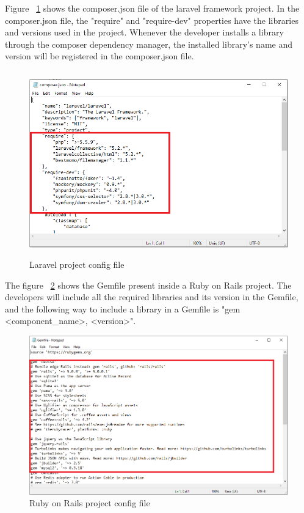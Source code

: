 Figure ~\ref{fig:laravel} shows the composer.json file of the laravel framework project. In the composer.json file, the "require" and "require-dev" properties have the libraries and versions used in the project. Whenever the developer installs a library through the composer dependency manager, the installed library's name and version will be registered in the composer.json file.
\begin{figure}[H]
	\includegraphics[width=15cm,height=8cm]{includes/laravel.PNG}
	\centering
	\caption{Laravel project config file}
	\label{fig:laravel}
\end{figure}
The figure ~\ref{fig:ruby} shows the Gemfile present inside a Ruby on Rails project. The developers will include all the required libraries and its version in the Gemfile, and the following way to include a library in a Gemfile is "gem <component\_name>, <version>".
\begin{figure}[H]
	\includegraphics[width=15cm]{includes/ruby.PNG}
	\centering
	\caption{Ruby on Rails project config file}
	\label{fig:ruby}
\end{figure}

